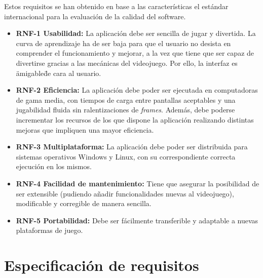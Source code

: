 Estos requisitos se han obtenido en base a las características el estándar internacional para la evaluación de la calidad del software.

\begin{itemize}
\tightlist
\item 
	\textbf{RNF-1 Usabilidad:} La aplicación debe ser sencilla de jugar y divertida. La curva de aprendizaje ha de ser baja para que el usuario no desista en comprender el funcionamiento y mejorar, a la vez que tiene que ser capaz de divertirse gracias a las mecánicas del videojuego. Por ello, la interfaz es \"amigable\" de cara al usuario.

\item 
	\textbf{RNF-2 Eficiencia:} La aplicación debe poder ser ejecutada en computadoras de gama media, con tiempos de carga entre pantallas aceptables y una jugabilidad fluida sin ralentizaciones de \textit{frames}. Además, debe poderse incrementar los recursos de los que dispone la aplicación realizando distintas mejoras que impliquen una mayor eficiencia.
	
\item 
	\textbf{RNF-3 Multiplataforma:} La aplicación debe poder ser distribuida para sistemas operativos Windows y Linux, con su correspondiente correcta ejecución en los mismos. 
	
\item 
	\textbf{RNF-4 Facilidad de mantenimiento:} Tiene que asegurar la posibilidad de ser extensible (pudiendo añadir funcionalidades nuevas al videojuego), modificable y corregible de manera sencilla.

\item 
	\textbf{RNF-5 Portabilidad:} Debe ser fácilmente transferible y adaptable a nuevas plataformas de juego.

\end{itemize}
\section{Especificación de requisitos}



